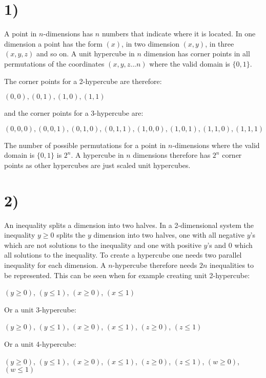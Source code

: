 \section*{1)}

A point in $n$-dimensions has $n$ numbers that indicate where it is located. In one dimension a point has the form $(x)$, in two dimension $(x, y)$, in three $(x, y, z)$ and so on. A unit hypercube in $n$ dimension has corner points in all permutations of the coordinates $(x, y, z...n)$ where the valid domain is $\{0, 1\}$. 

The corner points for a 2-hypercube are therefore:
\begin{center}
$(0,0), (0,1), (1,0), (1,1)$
\end{center}
and the corner points for a 3-hypercube are:
\begin{center}
$(0,0,0), (0,0,1), (0,1,0), (0,1,1), (1,0,0), (1,0,1), (1,1,0), (1,1,1)$
\end{center}
The number of possible permutations for a point in $n$-dimensions where the valid domain is $\{0, 1\}$ is $2^n$. A hypercube in $n$ dimensions therefore has $2^n$ corner points as other hypercubes are just scaled unit hypercubes. 

\section*{2)}
An inequality splits a dimension into two halves. In a 2-dimensional system the inequality $y \geq 0$ splits the $y$ dimension into two halves, one with all negative $y$'s which are not solutions to the inequality and one with positive $y$'s and 0 which all solutions to the inequality. To create a hypercube one needs two parallel inequality for each dimension. A $n$-hypercube therefore needs $2n$ inequalities to be represented.
This can be seen when for example creating unit 2-hypercube:\\
\begin{center}
$(y \geq 0)$, 
$(y \leq 1)$, 
$(x \geq 0)$, 
$(x \leq 1)$
\end{center}
\noindent
Or a unit 3-hypercube:\\
\begin{center}
$(y \geq 0)$, 
$(y \leq 1)$, 
$(x \geq 0)$, 
$(x \leq 1)$, 
$(z \geq 0)$, 
$(z \leq 1)$
\end{center}
Or a unit 4-hypercube:\\
\begin{center}
$(y \geq 0)$,
$(y \leq 1)$,
$(x \geq 0)$,
$(x \leq 1)$,
$(z \geq 0)$,
$(z \leq 1)$,
$(w \geq 0)$,
$(w \leq 1)$
\end{center}
